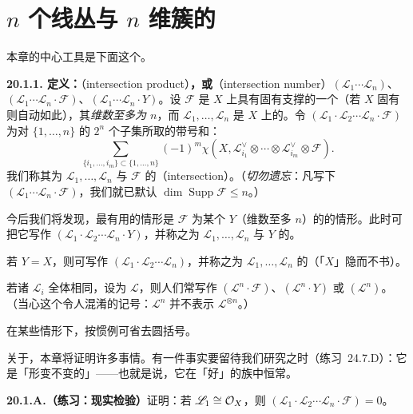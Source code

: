 
\section{$n$ 个线丛与 $n$ 维簇的\trIntersection}

本章的中心工具是下面这个。

\textbf{20.1.1. 定义：\trIntersectionProduct}（intersection product）\textbf{，或\trIntersectionNumber}（intersection number）$(\mathscr{L}_1\cdots\mathscr{L}_n)$、$(\mathscr{L}_1\cdots\mathscr{L}_n\cdot\mathscr{F})$、$(\mathscr{L}_1\cdots\mathscr{L}_n\cdot Y)$。\quad 设 $\mathscr{F}$ 是 $X$ 上具有固有支撑的一个\trCoherentSheaf（若 $X$ 固有则自动如此），其\emph{维数至多为 $n$}，而 $\mathscr{L}_1,\dots,\mathscr{L}_n$ 是 $X$ 上的\trInvertibleSheaf。令 $(\mathscr{L}_1\cdot\mathscr{L}_2\cdots\mathscr{L}_n\cdot\mathscr{F})$ 为对 $\{1,\dots,n\}$ 的 $2^n$ 个子集所取的带号和：
\begin{equation*}\tag{20.1.1.1}\label{eq:intersection-product-def}
\sum_{\{i_1,\dots,i_m\}\subset\{1,\dots,n\}}(-1)^m\chi(X,\mathscr{L}_{i_1}^{\vee}\otimes\cdots\otimes\mathscr{L}_{i_m}^{\vee}\otimes\mathscr{F}).
\end{equation*}
我们称其为 $\mathscr{L}_1,\dots,\mathscr{L}_n$ 与 $\mathscr{F}$ 的\textbf{\trIntersection}（intersection）。（\emph{切勿遗忘}：凡写下 $(\mathscr{L}_1\cdots\mathscr{L}_n\cdot\mathscr{F})$，我们就已默认 $\dim\operatorname{Supp}\mathscr{F}\le n$。）

今后我们将发现，最有用的情形是 $\mathscr{F}$ 为某个\trClosedSubscheme{} $Y$（维数至多 $n$）的\trStructureSheaf{}的情形。此时可把它写作 $(\mathscr{L}_1\cdot\mathscr{L}_2\cdots\mathscr{L}_n\cdot Y)$，并称之为 $\mathscr{L}_1,\dots,\mathscr{L}_n$ 与 $Y$ 的\textbf{\trIntersection}。

若 $Y=X$，则可写作 $(\mathscr{L}_1\cdot\mathscr{L}_2\cdots\mathscr{L}_n)$，并称之为 $\mathscr{L}_1,\dots,\mathscr{L}_n$ 的\textbf{\trIntersection}（「$X$」隐而不书）。

若诸 $\mathscr{L}_i$ 全体相同，设为 $\mathscr{L}$，则人们常写作 $(\mathscr{L}^n\cdot\mathscr{F})$、$(\mathscr{L}^n\cdot Y)$ 或 $(\mathscr{L}^n)$。（当心这个令人混淆的记号：$\mathscr{L}^n$ 并不表示 $\mathscr{L}^{\otimes n}$。）

在某些情形下，按惯例可省去圆括号。

关于\trIntersectionProduct，本章将证明许多事情。有一件事实要留待我们研究\trFlatness{}之时（\mbox{练习~24.7.D}）：它是「形变不变的」——也就是说，它在「好」的族中恒常。

\textbf{20.1.A.（练习：现实检验）}\quad 证明：若 $\mathscr{L}_1\cong\mathcal{O}_X$，则 $(\mathscr{L}_1\cdot\mathscr{L}_2\cdots\mathscr{L}_n\cdot\mathscr{F})=0$。

